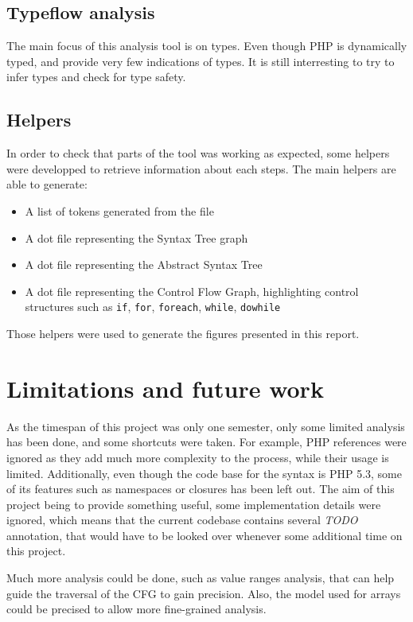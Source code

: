 \documentclass[a4paper]{article}
\begin{document}
\subsection{Typeflow analysis}
The main focus of this analysis tool is on types. Even though PHP is dynamically typed,
and provide very few indications of types. It is still interresting to try to infer types
and check for type safety.

\subsection{Helpers}
In order to check that parts of the tool was working as expected, some helpers were
developped to retrieve information about each steps. The main helpers are able to generate:
\begin{itemize}
  \item A list of tokens generated from the file
  \item A dot file representing the Syntax Tree graph
  \item A dot file representing the Abstract Syntax Tree
  \item A dot file representing the Control Flow Graph, highlighting control structures
    such as \verb=if=, \verb=for=, \verb=foreach=, \verb=while=, \verb=dowhile=
\end{itemize}

Those helpers were used to generate the figures presented in this report.

\section{Limitations and future work}
As the timespan of this project was only one semester, only some limited
analysis has been done, and some shortcuts were taken.  For example, PHP
references were ignored as they add much more complexity to the process, while
their usage is limited. Additionally, even though the code base for the syntax
is PHP 5.3, some of its features such as namespaces or closures has been left
out. The aim of this project being to provide something useful, some implementation
details were ignored, which means that the current codebase contains several
\emph{TODO} annotation, that would have to be looked over whenever some
additional time on this project.

Much more analysis could be done, such as value ranges analysis, that can help
guide the traversal of the CFG to gain precision. Also, the model used for
arrays could be precised to allow more fine-grained analysis.
\end{document}
